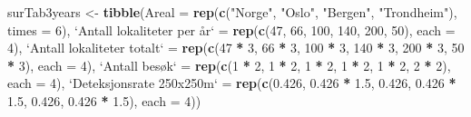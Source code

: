 \documentclass[]{article}
\newenvironment{Shaded}{\begin{snugshade}}{\end{snugshade}}
\newcommand{\KeywordTok}[1]{\textcolor[rgb]{0.13,0.29,0.53}{\textbf{#1}}}
\newcommand{\DataTypeTok}[1]{\textcolor[rgb]{0.13,0.29,0.53}{#1}}
\newcommand{\DecValTok}[1]{\textcolor[rgb]{0.00,0.00,0.81}{#1}}
\newcommand{\FloatTok}[1]{\textcolor[rgb]{0.00,0.00,0.81}{#1}}
\newcommand{\StringTok}[1]{\textcolor[rgb]{0.31,0.60,0.02}{#1}}
\newcommand{\OperatorTok}[1]{\textcolor[rgb]{0.81,0.36,0.00}{\textbf{#1}}}
\newcommand{\NormalTok}[1]{#1}
\begin{document}
\begin{Shaded}
\begin{Highlighting}[]
\NormalTok{surTab3years <-}\StringTok{ }\KeywordTok{tibble}\NormalTok{(}\DataTypeTok{Areal =} \KeywordTok{rep}\NormalTok{(}\KeywordTok{c}\NormalTok{(}\StringTok{"Norge"}\NormalTok{, }\StringTok{"Oslo"}\NormalTok{, }\StringTok{"Bergen"}\NormalTok{, }\StringTok{"Trondheim"}\NormalTok{), }
    \DataTypeTok{times =} \DecValTok{6}\NormalTok{), }\StringTok{`}\DataTypeTok{Antall lokaliteter per år}\StringTok{`}\NormalTok{ =}\StringTok{ }\KeywordTok{rep}\NormalTok{(}\KeywordTok{c}\NormalTok{(}\DecValTok{47}\NormalTok{, }\DecValTok{66}\NormalTok{, }\DecValTok{100}\NormalTok{, }\DecValTok{140}\NormalTok{, }\DecValTok{200}\NormalTok{, }
    \DecValTok{50}\NormalTok{), }\DataTypeTok{each =} \DecValTok{4}\NormalTok{), }\StringTok{`}\DataTypeTok{Antall lokaliteter totalt}\StringTok{`}\NormalTok{ =}\StringTok{ }\KeywordTok{rep}\NormalTok{(}\KeywordTok{c}\NormalTok{(}\DecValTok{47} \OperatorTok{*}\StringTok{ }\DecValTok{3}\NormalTok{, }\DecValTok{66} \OperatorTok{*}\StringTok{ }\DecValTok{3}\NormalTok{, }\DecValTok{100} \OperatorTok{*}\StringTok{ }
\StringTok{    }\DecValTok{3}\NormalTok{, }\DecValTok{140} \OperatorTok{*}\StringTok{ }\DecValTok{3}\NormalTok{, }\DecValTok{200} \OperatorTok{*}\StringTok{ }\DecValTok{3}\NormalTok{, }\DecValTok{50} \OperatorTok{*}\StringTok{ }\DecValTok{3}\NormalTok{), }\DataTypeTok{each =} \DecValTok{4}\NormalTok{), }\StringTok{`}\DataTypeTok{Antall besøk}\StringTok{`}\NormalTok{ =}\StringTok{ }\KeywordTok{rep}\NormalTok{(}\KeywordTok{c}\NormalTok{(}\DecValTok{1} \OperatorTok{*}\StringTok{ }\DecValTok{2}\NormalTok{, }
    \DecValTok{1} \OperatorTok{*}\StringTok{ }\DecValTok{2}\NormalTok{, }\DecValTok{1} \OperatorTok{*}\StringTok{ }\DecValTok{2}\NormalTok{, }\DecValTok{1} \OperatorTok{*}\StringTok{ }\DecValTok{2}\NormalTok{, }\DecValTok{1} \OperatorTok{*}\StringTok{ }\DecValTok{2}\NormalTok{, }\DecValTok{2} \OperatorTok{*}\StringTok{ }\DecValTok{2}\NormalTok{), }\DataTypeTok{each =} \DecValTok{4}\NormalTok{), }\StringTok{`}\DataTypeTok{Deteksjonsrate 250x250m}\StringTok{`}\NormalTok{ =}\StringTok{ }\KeywordTok{rep}\NormalTok{(}\KeywordTok{c}\NormalTok{(}\FloatTok{0.426}\NormalTok{, }
    \FloatTok{0.426} \OperatorTok{*}\StringTok{ }\FloatTok{1.5}\NormalTok{, }\FloatTok{0.426}\NormalTok{, }\FloatTok{0.426} \OperatorTok{*}\StringTok{ }\FloatTok{1.5}\NormalTok{, }\FloatTok{0.426}\NormalTok{, }\FloatTok{0.426} \OperatorTok{*}\StringTok{ }\FloatTok{1.5}\NormalTok{), }\DataTypeTok{each =} \DecValTok{4}\NormalTok{))}








\end{Highlighting}
\end{Shaded}
\end{document}
